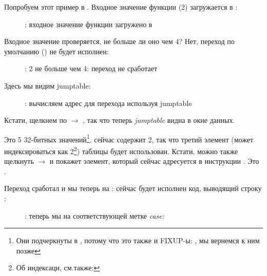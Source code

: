 ﻿\clearpage
\mysubparagraph{\olly}
\myindex{\olly}

Попробуем этот пример в \olly.
Входное значение функции (2) загружается в \EAX: 

\begin{figure}[H]
\centering
{}
\caption{\olly: входное значение функции загружено в \EAX}
\label{fig:switch_lot_olly1}
\end{figure}

\clearpage
Входное значение проверяется, не больше ли оно чем 4? 
Нет, переход по умолчанию () не будет исполнен:

\begin{figure}[H]
\centering
{}
\caption{\olly: 2 не больше чем 4: переход не сработает}
\label{fig:switch_lot_olly2}
\end{figure}

\clearpage
Здесь мы видим jumptable:

\begin{figure}[H]
\centering
{}
\caption{\olly: вычисляем адрес для перехода используя jumptable}
\label{fig:switch_lot_olly3}
\end{figure}

Кстати, щелкнем по  $\rightarrow$ , так что теперь \emph{jumptable} видна в окне данных.

Это 5 32-битных значений\footnote{Они подчеркнуты в \olly, потому что это также и FIXUP-ы: , мы вернемся к ним позже}.
\ECX сейчас содержит 2, так что третий элемент (может индексироваться как 2\footnote{Об индексаци, см.также: }) таблицы будет использован.
Кстати, можно также щелкнуть  $\rightarrow$  и \olly покажет элемент, который сейчас адресуется в инструкции \JMP. 
Это .

\clearpage
Переход сработал и мы теперь на : сейчас будет исполнен код, выводящий строку :

\begin{figure}[H]
\centering
{}
\caption{\olly: теперь мы на соответствующей метке \emph{case:}}
\label{fig:switch_lot_olly4}
\end{figure}
